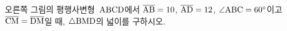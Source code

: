 \noindent\begin{minipage}[t]{0.58\linewidth}\vspace{0pt}\raggedright 오른쪽 그림의 평행사변형~$\mathrm{ABCD}$에서 $\overline{\mathrm{AB}}=10$, $\overline{\mathrm{AD}}=12$, $\angle\mathrm{ABC}=60^\circ$이고 $\overline{\mathrm{CM}}=\overline{\mathrm{DM}}$일 때, $\triangle\mathrm{BMD}$의 넓이를 구하시오.\end{minipage}\hfill\begin{minipage}[t]{0.4\linewidth}\vspace{0pt}\centering \resizebox{\ifdim\width>\linewidth\linewidth\else\width\fi}{!}{}\end{minipage}\par
